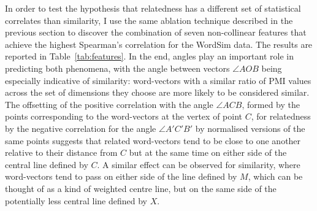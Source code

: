 In order to test the hypothesis that relatedness has a different set of statistical correlates than similarity, I use the same ablation technique described in the previous section to discover the combination of seven non-collinear features that achieve the highest Spearman's correlation for the WordSim data.  The results are reported in Table~\ref{tab:features}.  In the end, angles play an important role in predicting both phenomena, with the angle between vectors $\angle AOB$ being especially indicative of similarity: word-vectors with a similar ratio of PMI values across the set of dimensions they choose are more likely to be considered similar.  The offsetting of the positive correlation with the angle $\angle ACB$, formed by the points corresponding to the word-vectors at the vertex of point $C$, for relatedness by the negative correlation for the angle $\angle A'C'B'$ by normalised versions of the same points suggests that related word-vectors tend to be close to one another relative to their distance from $C$ but at the same time on either side of the central line defined by $C$.  A similar effect can be observed for similarity, where word-vectors tend to pass on either side of the line defined by $M$, which can be thought of as a kind of weighted centre line, but on the same side of the potentially less central line defined by $X$.

